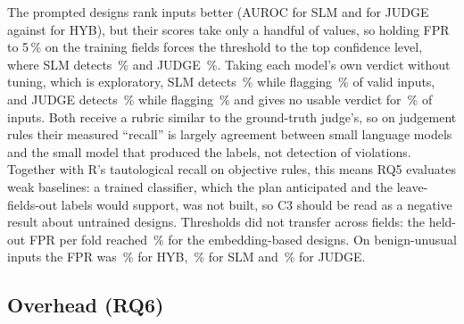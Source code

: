 \documentclass[conference]{IEEEtran}
\begin{document}
The prompted designs rank inputs better (AUROC  for SLM and  for
JUDGE against  for HYB), but their scores take only a handful of values, so holding FPR
to 5\,\% on the training fields forces the threshold to the top confidence level, where SLM detects
\,\% and JUDGE \,\%. Taking each model's own verdict without
tuning, which is exploratory, SLM detects \,\% while flagging \,\% of
valid inputs, and JUDGE detects \,\% while flagging \,\% and
gives no usable verdict for \,\% of inputs. Both receive a rubric similar to the
ground-truth judge's, so on judgement rules their measured ``recall'' is largely agreement between
small language models and the small model that produced the labels, not detection of violations.
Together with R's tautological recall on objective rules, this means RQ5 evaluates weak baselines: a
trained classifier, which the plan anticipated and the leave-fields-out labels would support, was not
built, so C3 should be read as a negative result about untrained designs. Thresholds
did not transfer across fields: the held-out FPR per fold reached \,\% for the
embedding-based designs. On benign-unusual inputs the FPR was \,\% for HYB,
\,\% for SLM and \,\% for JUDGE.

\subsection{Overhead (RQ6)}
\end{document}
